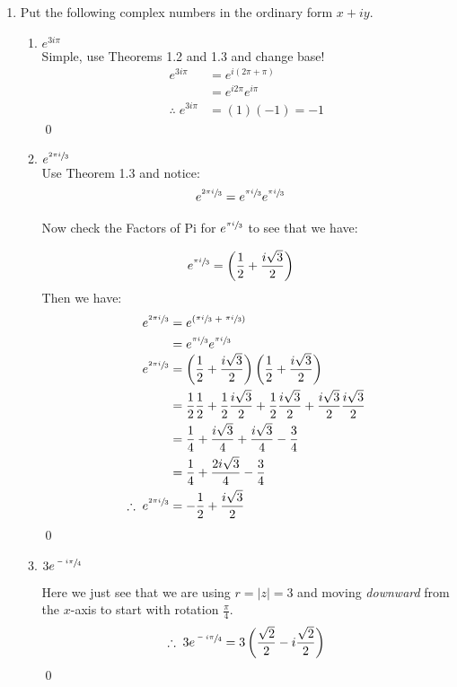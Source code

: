 \begin{enumerate}
	\item Put the following complex numbers in the ordinary form $x + iy.$
	\begin{enumerate}

		\item $e^{3i\pi}$ \\
		Simple, use Theorems 1.2 and 1.3 and change base!
		\begin{align*}
			e^{3i\pi} &= e^{i(2\pi + \pi)} \\
			&= e^{i2\pi}e^{i\pi} \\
			\therefore \; e^{3i\pi} &= (1)(-1) = -1
		\end{align*}
		\qed

		\item $e^{\sfrac{2\pi i}{3}}$ \\
		Use Theorem 1.3 and notice:
		\begin{align*}
			e^{\sfrac{2\pi i}{3}} &= e^{\sfrac{\pi i}{3}}e^{\sfrac{\pi i}{3}}
		\end{align*} 

		Now check the Factors of Pi for $e^{\sfrac{\pi i}{3}}$ to see that we have:

		\begin{align*}
			e^{\sfrac{\pi i}{3}} &= \left( \frac{1}{2} + \frac{i\sqrt{3}}{2} \right)
		\end{align*}
		Then we have:
		\begin{align*}
			e^{\sfrac{2\pi i}{3}} &= e^{(\sfrac{\pi i}{3} \; + \; \sfrac{\pi i}{3} )} \\
			&= e^{\sfrac{\pi i}{3}} e^{\sfrac{\pi i}{3}} \\
			e^{\sfrac{2\pi i}{3}} &= \left( \frac{1}{2} + \frac{i\sqrt{3}}{2} \right) \left( \frac{1}{2} + \frac{i\sqrt{3}}{2} \right) \\
			&= \frac{1}{2} \frac{1}{2} + \frac{1}{2} \frac{i \sqrt{3}}{2} + \frac{1}{2} \frac{i \sqrt{3}}{2} + \frac{i \sqrt{3}}{2} \frac{i \sqrt{3}}{2} \\
			&= \frac{1}{4} +\frac{i \sqrt{3}}{4} + \frac{i \sqrt{3}}{4} - \frac{3}{4} \\
			&= \frac{1}{4} + \frac{2i \sqrt{3}}{4} - \frac{3}{4} \\
			\therefore \; e^{\sfrac{2\pi i}{3}} &=  - \frac{1}{2} + \frac{i \sqrt{3}}{2} \\
		\end{align*}
		\qed
		
		\item $3e^{\sfrac{-i\pi}{4}}$

		Here we just see that we are using $r = |z| = 3$ and moving \textit{downward} from the $x$-axis to start with rotation $\frac{\pi}{4}.$
		\begin{align*}
			\therefore \; 3e^{\sfrac{-i\pi}{4}} &= 3 \left( \frac{\sqrt{2}}{2} - i\frac{\sqrt{2}}{2} \right) \\
		\end{align*}
		\qed



\end{enumerate}
\end{enumerate}
